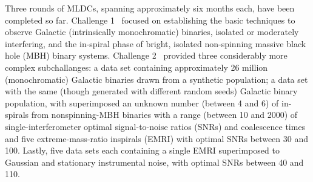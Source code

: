 \documentclass{iopart}
\begin{document}

Three rounds of MLDCs, spanning approximately six months each, have been completed so far. Challenge 1~\cite{mldclisasymp,mldcgwdaw1} focused on establishing the basic techniques to observe Galactic (intrinsically monochromatic) binaries, isolated or moderately interfering, and the in-spiral phase of bright, isolated non-spinning massive black hole (MBH) binary systems. Challenge 2~\cite{mldcgwdaw2} provided three considerably more complex subchallanges: a data set containing approximately 26 million (monochromatic) Galactic binaries drawn from a synthetic population; a data set with the same (though generated with different random seeds) Galactic binary population, with superimposed an unknown number (between 4 and 6) of in-spirals from nonspinning-MBH binaries with a range (between 10 and 2000) of single-interferometer optimal signal-to-noise ratios (SNRs) and coalescence times and five extreme-mass-ratio inspirals (EMRI) with optimal SNRs between 30 and 100. Lastly, five data sets each containing a single EMRI superimposed to Gaussian and stationary instrumental noise, with optimal SNRs between 40 and 110.

\end{document}
